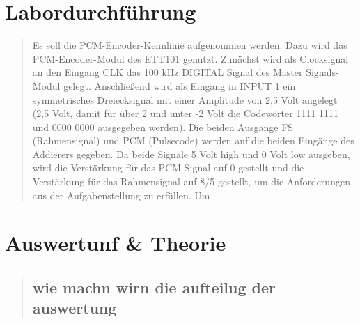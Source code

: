 \section{Labordurchführung}
\begin{quote}

	Es soll die PCM-Encoder-Kennlinie aufgenommen werden.
	Dazu wird das PCM-Encoder-Modul des ETT101 genutzt. Zunächst wird als Clocksignal an den Eingang CLK das 
	100 kHz DIGITAL Signal des Master Signals-Modul gelegt. Anschließend wird als Eingang in INPUT 1 ein 
	symmetrisches Dreiecksignal mit einer Amplitude von 2,5 Volt angelegt (2,5 Volt, damit für über 2 und unter -2 Volt die
	Codewörter 1111 1111 und 0000 0000 ausgegeben werden). 
	Die beiden Ausgänge FS (Rahmensignal) und PCM (Pulsecode) werden auf die beiden Eingänge des Addierers gegeben. Da
	beide Signale 5 Volt high und 0 Volt low ausgeben, wird die Verstärkung für das PCM-Signal auf 0 gestellt und die
	Verstärkung für das Rahmensignal auf 8/5 gestellt, um die Anforderungen aus der Aufgabenstellung zu erfüllen.
	Um 
 	
	
	
\end{quote}

\section{Auswertunf \& Theorie}
\begin{quote}
    
    
    \subsection{wie machn wirn die aufteilug der auswertung}
    \begin{quote}
        
    \end{quote}
    
    
    
    
    
\end{quote}






